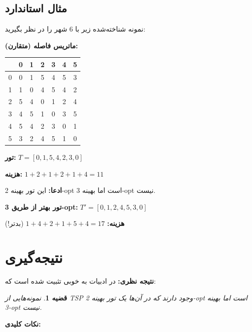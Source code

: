 \documentclass[12pt,a4paper]{article}
\newtheorem{theorem}{قضیه}[section]
\begin{document}
\subsection{مثال استاندارد}

نمونه شناخته‌شده زیر با 6 شهر را در نظر بگیرید:

\textbf{ماتریس فاصله (متقارن):}

\begin{table}[h]
\centering
\begin{tabular}{|c|c|c|c|c|c|c|}
\hline
 & 0 & 1 & 2 & 3 & 4 & 5 \\
\hline
0 & 0 & 1 & 5 & 4 & 5 & 3 \\
1 & 1 & 0 & 4 & 5 & 4 & 2 \\
2 & 5 & 4 & 0 & 1 & 2 & 4 \\
3 & 4 & 5 & 1 & 0 & 3 & 5 \\
4 & 5 & 4 & 2 & 3 & 0 & 1 \\
5 & 3 & 2 & 4 & 5 & 1 & 0 \\
\hline
\end{tabular}
\end{table}

\textbf{تور:} $T = [0, 1, 5, 4, 2, 3, 0]$

\textbf{هزینه:} $1 + 2 + 1 + 2 + 1 + 4 = 11$

\textbf{ادعا:} این تور بهینه 2-opt است اما بهینه 3-opt نیست.

\textbf{تور بهتر از طریق 3-opt:} $T' = [0, 1, 2, 4, 5, 3, 0]$

\textbf{هزینه:} $1 + 4 + 2 + 1 + 5 + 4 = 17$ (بدتر!)

\section{نتیجه‌گیری}

\textbf{نتیجه نظری:} در ادبیات به خوبی تثبیت شده است که:

\begin{theorem}
نمونه‌هایی از TSP وجود دارند که در آن‌ها یک تور بهینه 2-opt است اما بهینه 3-opt نیست.
\end{theorem}

\textbf{نکات کلیدی:}
\end{document}
